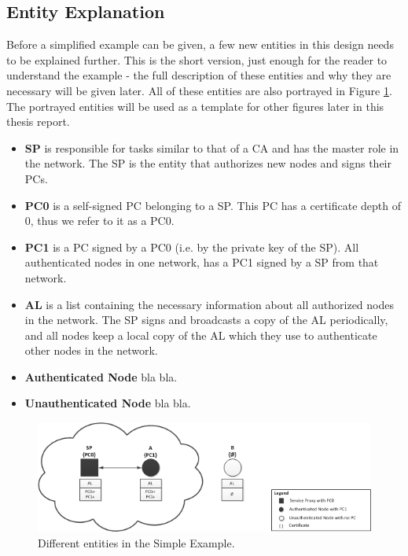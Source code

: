 \subsection{Entity Explanation}

Before a simplified example can be given, a few new entities in this design
needs to be explained further. This is the short version, just enough for the
reader to understand the example - the full description of these entities
and why they are necessary will be given later. All of these entities are also
portrayed in Figure \ref{fig:simple_example_entities}. The portrayed entities
will be used as a template for other figures later in this thesis report.

\begin{itemize}
  \item \textbf{\acf{SP}} is responsible for tasks similar to that of a \ac{CA}
  	and has the master role in the network. The \ac{SP} is the entity that
 	 authorizes new nodes and signs their \acp{PC}.
  \item \textbf{\acf{PC0}} is a self-signed \ac{PC} belonging to a
  	\ac{SP}. This \ac{PC} has a certificate depth of 0, thus we refer to it as a
  	\ac{PC0}.
  \item \textbf{\acf{PC1}} is a \ac{PC} signed by a \ac{PC0} (i.e. by the
  private key of the \ac{SP}). All authenticated nodes in one network, has a
  \ac{PC1} signed by a \ac{SP} from that network.
  \item \textbf{\acf{AL}} is a list containing the necessary information about
 	all authorized nodes in the network. The \ac{SP} signs and broadcasts a copy
 	of the \ac{AL} periodically, and all nodes keep a local copy of the \ac{AL}
  	which they use to authenticate other nodes in the network.
  \item \textbf{Authenticated Node} bla bla.
  \item \textbf{Unauthenticated Node} bla bla.
\end{itemize}

\begin{figure}[h]
	\centering
  	\includegraphics{images/simple_example_entities.png}
  	\caption{Different entities in the Simple Example.}
	\label{fig:simple_example_entities}
\end{figure}

